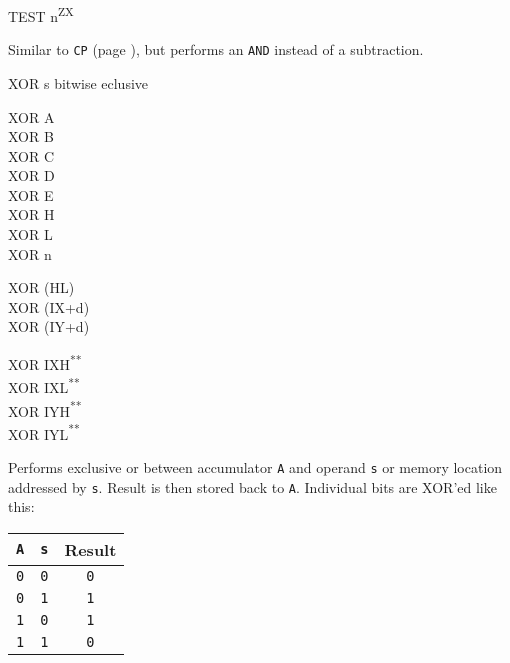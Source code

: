 \documentclass[12pt,twoside,openright,a4paper]{book}
\newcommand{\UNDOC}{\textnormal{\textsuperscript{**}}}
\newcommand{\ZXN}{\textnormal{\textsuperscript{ZX}}}
\begin{document}
\begin{basedescript}{
	\desclabelstyle{\multilinelabel}
	\desclabelwidth{3cm}}
	\begin{DetailItem}{TEST n\ZXN}
		{}
		{\SymTEST}

		Similar to {\tt CP} (page \pageref{DetailRefCP}), but performs an {\tt AND} instead of a subtraction.

		\begin{DetailEffects}[v]
			\DetailFlags{\FS}{\FS}{\FS}{\FS}{\FU}{\FS}
		\end{DetailEffects}
						
		\begin{DetailTiming}
		\end{DetailTiming}

	\end{DetailItem}

	\pagebreak
	\begin{DetailItem}{XOR s}
		{bitwise eclusive }
		{}

		\begin{DetailVariants}
			XOR A\\
			XOR B\\
			XOR C\\
			XOR D\\
			XOR E\\
			XOR H\\
			XOR L\\
			XOR n

			\columnbreak
			XOR (HL)\\
			XOR (IX+d)\\
			XOR (IY+d)

			\columnbreak
			XOR IXH\UNDOC\\
			XOR IXL\UNDOC\\
			XOR IYH\UNDOC\\
			XOR IYL\UNDOC
		\end{DetailVariants}

		Performs exclusive or between accumulator {\tt A} and operand {\tt s} or memory location addressed by {\tt s}. Result is then stored back to {\tt A}. Individual bits are XOR'ed like this:

		\begin{tabular}{cc|c}
			{\tt A} & {\tt s} & Result \\
			\hline
			{\tt 0} & {\tt 0} & {\tt 0} \\
			{\tt 0} & {\tt 1} & {\tt 1} \\
			{\tt 1} & {\tt 0} & {\tt 1} \\
			{\tt 1} & {\tt 1} & {\tt 0} \\
		\end{tabular}


\end{DetailItem}
\end{basedescript}
\end{document}
